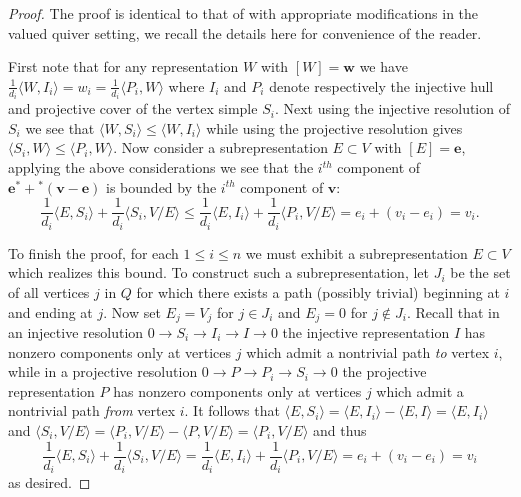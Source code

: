 \documentclass[12pt]{amsart}
\newcommand{\bfe}{\mathbf{e}}
\newcommand{\bfv}{\mathbf{v}}
\newcommand{\bfw}{\mathbf{w}}
\begin{document}
  \begin{proof}
    The proof is identical to that of \cite[Sec. 4, Cor. 2]{caldero-keller} with appropriate modifications in the valued quiver setting, we recall the details here for convenience of the reader.  

    First note that for any representation $W$ with $[W]=\bfw$ we have $\frac{1}{d_i}\langle W,I_i\rangle=w_i=\frac{1}{d_i}\langle P_i,W\rangle$ where $I_i$ and $P_i$ denote respectively the injective hull and projective cover of the vertex simple $S_i$.  Next using the injective resolution of $S_i$ we see that $\langle W,S_i\rangle\le\langle W,I_i\rangle$ while using the projective resolution gives $\langle S_i,W\rangle\le\langle P_i,W\rangle$.  Now consider a subrepresentation $E\subset V$ with $[E]=\bfe$, applying the above considerations we see that the $i^{th}$ component of $\bfe^*+{}^*(\bfv-\bfe)$ is bounded by the $i^{th}$ component of $\bfv$:
    \[\frac{1}{d_i}\langle E,S_i\rangle+\frac{1}{d_i}\langle S_i,V/E\rangle\le\frac{1}{d_i}\langle E,I_i\rangle+\frac{1}{d_i}\langle P_i,V/E\rangle=e_i+(v_i-e_i)=v_i.\]

    To finish the proof, for each $1\le i\le n$ we must exhibit a subrepresentation $E\subset V$ which realizes this bound.  
    To construct such a subrepresentation, let $J_i$ be the set of all vertices $j$ in $Q$ for which there exists a path (possibly trivial) beginning at $i$ and ending at $j$.  
    Now set $E_j=V_j$ for $j\in J_i$ and $E_j=0$ for $j\notin J_i$.  
    Recall that in an injective resolution $0\longrightarrow S_i\longrightarrow I_i\longrightarrow I\longrightarrow 0$ the injective representation $I$ has nonzero components only at vertices $j$ which admit a nontrivial path \emph{to} vertex $i$, while in a projective resolution $0\longrightarrow P\longrightarrow P_i\longrightarrow S_i\longrightarrow 0$ the projective representation $P$ has nonzero components only at vertices $j$ which admit a nontrivial path \emph{from} vertex $i$.  
    It follows that $\langle E,S_i\rangle=\langle E,I_i\rangle-\langle E,I\rangle=\langle E,I_i\rangle$ and $\langle S_i,V/E\rangle=\langle P_i,V/E\rangle-\langle P,V/E\rangle=\langle P_i,V/E\rangle$ and thus 
    \[\frac{1}{d_i}\langle E,S_i\rangle+\frac{1}{d_i}\langle S_i,V/E\rangle=\frac{1}{d_i}\langle E,I_i\rangle+\frac{1}{d_i}\langle P_i,V/E\rangle=e_i+(v_i-e_i)=v_i\]
    as desired.
  \end{proof}
\end{document}
